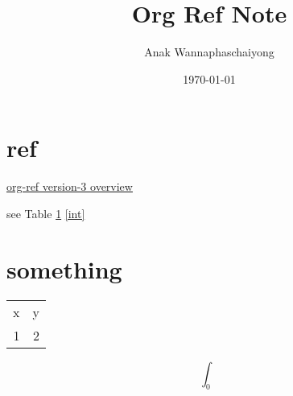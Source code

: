 \documentclass[11pt]{article}
\author{Anak Wannaphaschaiyong}
\date{\today}
\title{Org Ref Note}
\begin{document}
\maketitle
\tableofcontents


\section{ref}
\label{sec:orgcf06ac3}
\href{https://www.youtube.com/watch?v=3u6eTSzHT6s\&ab\_channel=JohnKitchin}{org-ref version-3 overview}

see Table \ref{data}
\eqref{int}
\section{something}
\label{sec:org6a5d9c8}
\begin{table}[htbp]
\label{data}
\centering
\begin{tabular}{rr}
x & y\\
1 & 2\\
\end{tabular}
\end{table}


\begin{equation}\label{int}
\int_{0}
\end{equation}
\end{document}
